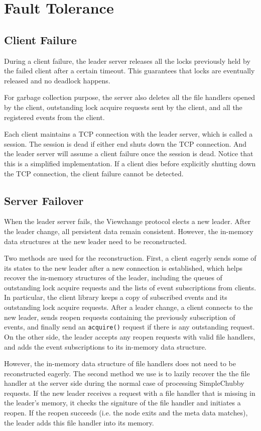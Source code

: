 \section{Fault Tolerance}
\label{section:failure}

\subsection{Client Failure}

During a client failure, the leader server releases all the locks
previously held by the failed client after a certain timeout.
This guarantees that locks are eventually released and no deadlock happens.

For garbage collection
purpose, the server also deletes all the file handlers opened by the client,
outstanding lock acquire requests sent by the client, and all the registered
events from the client.

Each client maintains a TCP connection with the leader server,
which is called a session.
The session is dead if either end shuts down the TCP connection.
And the leader server will assume a client failure once the session is dead.
Notice that this is a simplified implementation.
If a client dies before explicitly shutting down the TCP connection,
the client failure cannot be detected.

\subsection{Server Failover}

When the leader server fails, the Viewchange protocol elects a new leader. After
the leader change, all persistent data remain consistent. However, the in-memory
data structures at the new leader need to be reconstructed. 

Two methods are used for the reconstruction.
First, a client eagerly sends some of its states to the new leader after
a new connection is established, which helps recover the in-memory structures of
the leader, including the queues of outstanding lock acquire requests and
the lists of event subscriptions from clients. In particular, the client library
keeps a copy of subscribed events and its outstanding lock acquire requests.
After a leader change, a client connects to the new leader, sends
reopen requests containing the previously subscription of events, and finally
send an \texttt{acquire()} request if there is any outstanding request.
On the other side, the leader accepts any reopen requests with valid file
handlers, and adds the event subscriptions to its in-memory data structure.

However, the in-memory data structure of file handlers does not need to be
reconstructed eagerly. The second method we use is to lazily recover the
the file handler at the server side during the normal case of processing
SimpleChubby requests.
If the new leader receives a request with a file handler that
is missing in the leader's memory, it checks the signiture of the file
handler and initiates a reopen. If the reopen succeeds (i.e. the node exits
and the meta data matches), the leader adds this file handler into its memory.
